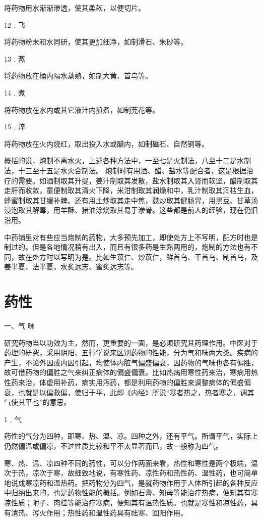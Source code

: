 \documentclass[12pt,UTF8]{ctexbook}
\begin{document}
将药物用水渐渐渗透，使其柔软，以便切片。

12﹒飞

将药物粉末和水同研，使其更加细净，如制滑石、朱砂等。

13﹒蒸

将药物放在桶内隔水蒸熟，如制大黄、首乌等。

14﹒煮

将药物放在水内或其它液汁内煎煮，如制芫花等。

15﹒淬

将药物放在火内烧红，取出投入水或醋内，如制磁石、自然铜等。

概括的说，炮制不离水火，上述各种方法中，一至七是火制法，八至十二是水制法，十三至十五是水火合制法。
炮制时有用酒、醋、盐水等配合者，这是根据治疗的需要。如酒制取其升提，姜汁制取其发散，盐水制取其入肾而软坚，醋制取其走肝而收敛，童便制取其清火下降，米泔制取其润燥和中，乳汁制取其润枯生血，蜂蜜制取其甘缓补脾。还有用土炒取其走中焦，麸炒取其健肠胃，用黑豆、甘草汤浸泡取其解毒，用羊酥、猪油涂烧取其易于渗骨。这些都是前人的经验，现在仍旧沿用。

中药铺里对有些应当炮制的药物，大多预先加工，即使处方上不写明，配方时也是制过的。但是各地情况稍有出入，而且有很多药是生熟两用的，炮制的方法也有不同，故在处方时以写明为是。比如生苡仁、炒苡仁，鲜首乌、干首乌、制首乌，及姜半夏、法半夏，水炙远志、蜜炙远志等。

\section{药性}

一、气 味

研究药物当以功效为主，然而，更重要的一面，是必须研究其药理作用。中医对于药理的研究，采用阴阳、五行学说来区别药物的性能，分为气和味两大类。疾病的产生，不论外因或内因引起，均使体内脏气偏盛偏衰，因药物的气味也各有偏胜，故可借药物的偏胜之气来纠正病体的偏盛偏衰。比如热病用寒性药来治，寒病用热性药来治，体虚用补药，病实用泻药，都是利用药物的偏胜来调整病体的偏盛偏衰，也就是以偏救偏，使归于平，此即《内经》所说“寒者热之，热者寒之，调其气使其平也”的意思。

1﹒气

药性的气分为四种，即寒、热、温、凉。四种之外，还有平气。所谓平气，实际上仍然偏温或偏凉，不过性质比较和平不太显著而已，故一般称为四气。

寒、热、温、凉四种不同的药性，可以分作两面来看，热性和寒性是两个极端，温次于热，凉次于寒，故细致地说，有寒性药、凉性药和热性药、温性药，也可简单地说成寒凉药和温热药。把药物分为四气，是就药物作用于人体所引起的各种反应中归纳出来的，也是药物性能的概括。例如石膏、知母等能治疗热病，便知其有寒凉性质；附子、肉桂等能治疗寒病，便知其有温热性质。也就是寒性和凉性药，具有清热、泻火作用；热性药和温性药具有祛寒、回阳作用。
\end{document}

